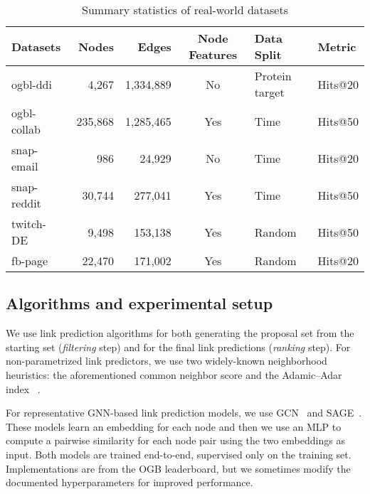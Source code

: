 \documentclass{article}
\newcommand{\xhdr}[1]{\vspace{1.0mm}\noindent{\textbf{#1.}}\hspace{1mm}}
\begin{document}
\begin{table}[t]
\caption{Summary statistics of real-world datasets
}
\vspace{-1\baselineskip}
\label{tab:stats}
\begin{center}
\begin{tabular}{l r r c l l}
\toprule
Datasets & Nodes & Edges & Node Features & Data Split  & Metric\\
\midrule
ogbl-ddi~\cite{Hu2020OpenGB}   & 4,267	& 1,334,889	&No & Protein target  & Hits@20 \\
ogbl-collab~\cite{Hu2020OpenGB}  &235,868 &	1,285,465	& Yes & Time  & Hits@50 \\
snap-email~\cite{Paranjape2017MotifsIT}  & 986  & 24,929 & No & Time  &  Hits@20 \\
snap-reddit~\cite{Kumar2018CommunityIA} & 30,744 & 277,041 & Yes & Time  &  Hits@50\\
twitch-DE~\cite{rozemberczki2019multiscale} & 9,498 & 153,138 & Yes & Random  &  Hits@50\\
fb-page~\cite{rozemberczki2019multiscale} & 22,470 & 171,002 & Yes & Random  &  Hits@20\\
\bottomrule
\end{tabular}
\end{center}
\end{table}

\subsection{Algorithms and experimental setup}

\xhdr{Link prediction algorithms}
We use link prediction algorithms for both generating the proposal set from the starting set (\emph{filtering} step) 
and for the final link predictions (\emph{ranking} step).
For non-parametrized link predictors, we use two widely-known neighborhood heuristics: 
the aforementioned common neighbor score  and the
Adamic--Adar index ~\cite{adamic2003friends}. 

For representative GNN-based link prediction models, we use GCN~\cite{Kipf2017SemiSupervisedCW} and SAGE~\cite{Hamilton2017InductiveRL}.
These models learn an embedding for each node and then we use an MLP to compute a pairwise similarity for each node pair using the two embeddings as input.
Both models are trained end-to-end, supervised only on the training set.
Implementations are from the OGB leaderboard, but
we sometimes modify the documented hyperparameters for improved performance.
\end{document}
